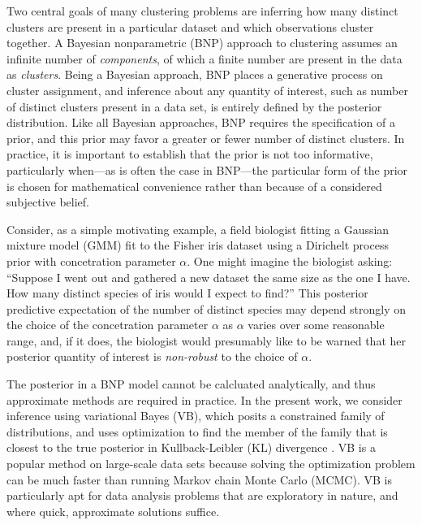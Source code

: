 Two central goals of many clustering problems are inferring how many distinct
clusters are present in a particular dataset and which observations cluster
together. A Bayesian nonparametric (BNP) approach to clustering assumes an
infinite number of \textit{components}, of which a finite number are present in
the data as \textit{clusters}. Being a Bayesian approach, BNP places a
generative process on cluster assignment, and inference about any quantity of
interest, such as number of distinct clusters present in a data set, is entirely
defined by the posterior distribution. Like all Bayesian approaches, BNP
requires the specification of a prior, and this prior may favor a greater or
fewer number of distinct clusters. In practice, it is important to establish
that the prior is not too informative, particularly when---as is often the case
in BNP---the particular form of the prior is chosen for mathematical convenience
rather than because of a considered subjective belief.

Consider, as a simple motivating example, a field biologist fitting a Gaussian
mixture model (GMM) fit to the Fisher iris dataset \citep{anderson:1936:iris,
fisher:1936:iris} using a Dirichelt process prior with concetration parameter
$\alpha$.  One might imagine the biologist asking: ``Suppose I went out and
gathered a new dataset the same size as the one I have.  How many distinct
species of iris would I expect to find?''  This posterior predictive expectation
of the number of distinct species may depend strongly on the choice of the
concetration parameter $\alpha$ as $\alpha$ varies over some reasonable range,
and, if it does, the biologist would presumably like to be warned that her
posterior quantity of interest is {\em non-robust} to the choice of $\alpha$.

The posterior in a BNP model cannot be calcluated analytically, and thus
approximate methods are required in practice. In the present work, we consider
inference using variational Bayes (VB), which posits a constrained family of
distributions, and uses optimization to find the member of the family that is
closest to the true posterior in Kullback-Leibler ($\mathrm{KL}$) divergence
\citep{blei:2017:vi_review, blei:2006:vi_for_dp}. VB is a popular method on
large-scale data sets because solving the optimization problem can be much
faster than running Markov chain Monte Carlo (MCMC). VB is particularly apt for
data analysis problems that are exploratory in nature, and where quick,
approximate solutions suffice.


